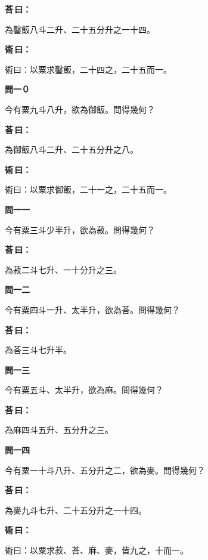 \documentclass[11pt,a4paper]{article}
\newenvironment{problem}[1][]{%
  \par\vspace{0.6em}\noindent\textcolor{problemcolor}{\textbf{問\ignorespaces#1\unskip}\hspace{0.5em}}%
  \ignorespaces
}{\par\vspace{0.4em}}
\newenvironment{answer}{%
  \par\noindent\textcolor{answercolor}{\textbf{荅\,曰：}}%
  \ignorespaces
}{\par\vspace{0.3em}}
\newenvironment{method}{%
  \par\noindent\textcolor{methodcolor}{\textbf{術\,曰：}}%
  \ignorespaces
}{\par\vspace{0.4em}}
\begin{document}
\begin{answer}
為鑿飯八斗二升、二十五分升之一十四。
\end{answer}

\begin{method}
術曰：以粟求鑿飯，二十四之，二十五而一。
\end{method}

\begin{problem}[一０]
今有粟九斗八升，欲為御飯。問得幾何？
\end{problem}

\begin{answer}
為御飯八斗二升、二十五分升之八。
\end{answer}

\begin{method}
術曰：以粟求御飯，二十一之，二十五而一。
\end{method}

\begin{problem}[一一]
今有粟三斗少半升，欲為菽。問得幾何？
\end{problem}

\begin{answer}
為菽二斗七升、一十分升之三。
\end{answer}

\begin{problem}[一二]
今有粟四斗一升、太半升，欲為荅。問得幾何？
\end{problem}

\begin{answer}
為荅三斗七升半。
\end{answer}

\begin{problem}[一三]
今有粟五斗、太半升，欲為麻。問得幾何？
\end{problem}

\begin{answer}
為麻四斗五升、五分升之三。
\end{answer}

\begin{problem}[一四]
今有粟一十斗八升、五分升之二，欲為麥。問得幾何？
\end{problem}

\begin{answer}
為麥九斗七升、二十五分升之一十四。
\end{answer}

\begin{method}
術曰：以粟求菽、荅、麻、麥，皆九之，十而一。
\end{method}
\end{document}
